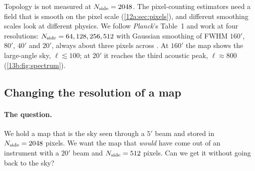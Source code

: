 Topology is not measured at $N_{\rm side}=2048$. The pixel-counting estimators need a field that is smooth on
the pixel scale (\cref{12a:sec:pixels}), and different smoothing scales look at different physics. We follow
\textit{Planck}'s Table~1 and work at four resolutions: $N_{\rm side}=64,128,256,512$ with Gaussian smoothing of
FWHM $160'$, $80'$, $40'$ and $20'$, always about three pixels across \cite{Planck2018VII}. At $160'$ the map
shows the large-angle sky, $\ell\lesssim100$; at $20'$ it reaches the third acoustic peak, $\ell\approx800$
(\cref{13b:fig:spectrum}).

\subsection{Changing the resolution of a map}
\label{13b:sec:degrade}

\paragraph{The question.} We hold a map that is the sky seen through a $5'$ beam and stored in
$N_{\rm side}=2048$ pixels. We want the map that \emph{would} have come out of an instrument with a $20'$ beam and
$N_{\rm side}=512$ pixels. Can we get it without going back to the sky?

